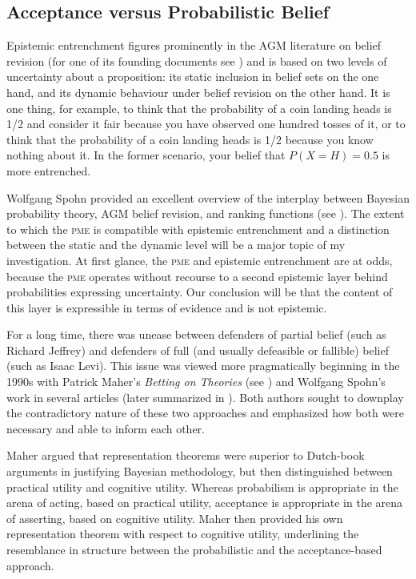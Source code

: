 \documentclass[11pt]{article}
\begin{document}

\subsection{Acceptance versus Probabilistic Belief}
\label{ThePrincipleOfMaximumEntropyVices}

Epistemic entrenchment figures prominently in the AGM literature on
belief revision (for one of its founding documents see
) and is based on two levels of uncertainty about a
proposition: its static inclusion in belief sets on the one hand, and
its dynamic behaviour under belief revision on the other hand. It is
one thing, for example, to think that the probability of a coin
landing heads is 1/2 and consider it fair because you have observed
one hundred tosses of it, or to think that the probability of a coin
landing heads is 1/2 because you know nothing about it. In the former
scenario, your belief that $P(X=H)=0.5$ is more entrenched.

Wolfgang Spohn provided an excellent overview of the interplay between
Bayesian probability theory, AGM belief revision, and ranking
functions (see ). The extent to which the
\textsc{pme} is compatible with epistemic entrenchment and a
distinction between the static and the dynamic level will be a major
topic of my investigation. At first glance, the \textsc{pme} and
epistemic entrenchment are at odds, because the \textsc{pme} operates
without recourse to a second epistemic layer behind probabilities
expressing uncertainty. Our conclusion will be that the content of
this layer is expressible in terms of evidence and is not epistemic.

For a long time, there was unease between defenders of partial belief
(such as Richard Jeffrey) and defenders of full (and usually
defeasible or fallible) belief (such as Isaac Levi). This issue was
viewed more pragmatically beginning in the 1990s with Patrick Maher's
\emph{Betting on Theories} (see ) and Wolfgang
Spohn's work in several articles (later summarized in
). Both authors sought to downplay the
contradictory nature of these two approaches and emphasized how both
were necessary and able to inform each other.

Maher argued that representation theorems were superior to Dutch-book
arguments in justifying Bayesian methodology, but then distinguished
between practical utility and cognitive utility. Whereas probabilism
is appropriate in the arena of acting, based on practical utility,
acceptance is appropriate in the arena of asserting, based on
cognitive utility. Maher then provided his own representation theorem
with respect to cognitive utility, underlining the resemblance in
structure between the probabilistic and the acceptance-based approach.
\end{document}
